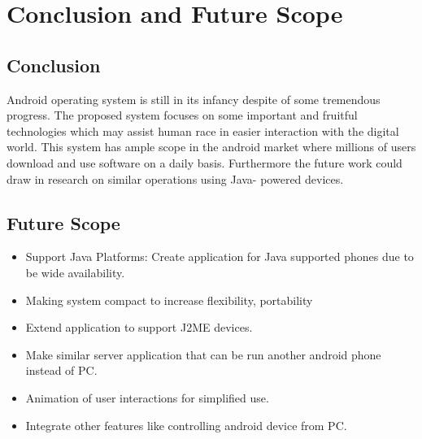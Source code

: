 \chapter{Conclusion and Future Scope}
\section{Conclusion}
\hspace*{0.82cm}Android operating system is still in its infancy despite of some tremendous progress.
The proposed system focuses on some important and fruitful technologies which may assist
human race in easier interaction with the digital world. This system has ample scope in the
android market where millions of users download and use software on a daily basis.
Furthermore the future work could draw in research on similar operations using Java-
powered devices.
\section{Future Scope}
\begin{itemize}
 \item Support Java Platforms: Create application for Java supported phones due to be wide
availability.
 \item Making system compact to increase flexibility, portability
 \item Extend application to support J2ME devices.
 \item Make similar server application that can be run another android phone instead of PC.
 \item Animation of user interactions for simplified use.
 \item Integrate other features like controlling android device from PC.
\end{itemize}